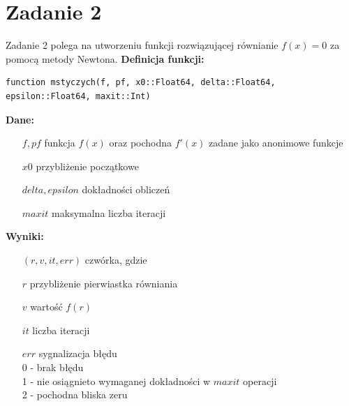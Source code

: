 \documentclass[12pt]{article}
\begin{document}
\section{Zadanie 2}
Zadanie 2 polega na utworzeniu funkcji rozwiązującej równianie $f(x) = 0$ za pomocą metody Newtona. \textbf{Definicja funkcji:}
\begin{verbatim}
function mstyczych(f, pf, x0::Float64, delta::Float64, 
epsilon::Float64, maxit::Int)
\end{verbatim}
\textbf{Dane:}
\begin{itemize}[leftmargin=4.0cm,labelsep=0.4cm]
\item[$f, pf$] funkcja $f(x)$ oraz pochodna $f'(x)$ zadane jako anonimowe funkcje
\item[$x0$] przybliżenie początkowe
\item[$delta, epsilon$] dokładności obliczeń
\item[$maxit$] maksymalna liczba iteracji
\end{itemize}
\textbf{Wyniki:} 
\begin{itemize}[leftmargin=4.0cm,labelsep=0.4cm]
\item[$(r, v, it, err)$] czwórka, gdzie
\item[$r$] przybliżenie pierwiastka równiania 
\item[$v$] wartość $f(r)$
\item[$it$] liczba iteracji
\item[$err$] sygnalizacja błędu\\
0 - brak błędu\\
1 - nie osiągnieto wymaganej dokładności w $maxit$ operacji\\
2 - pochodna bliska zeru
\end{itemize}
\end{document}
